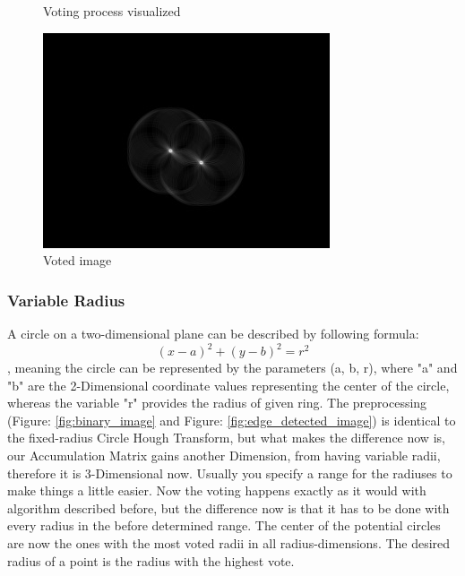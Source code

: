 \begin{figure}[H]
	\caption{Voting process visualized}\label{fig:circlehough_explanation}
	\endminipage
	\hfill
	\includegraphics[width=\linewidth]{images/hough_circle.jpg}
	\caption{Voted image }\label{fig:voted_image}
	\endminipage
\end{figure}

\subsubsection{Variable Radius}
A circle on a two-dimensional plane can be described by following formula: \[ (x - a)^2 + (y - b)^2 = r^2  \]
, meaning the circle can be represented by the parameters (a, b, r), where "a" and "b" are the 2-Dimensional coordinate values representing the center of the circle, whereas the variable "r" provides the radius of given ring. \newline
The preprocessing (Figure: \ref{fig:binary_image} and Figure: \ref{fig:edge_detected_image}) is identical to the fixed-radius Circle Hough Transform, but what makes the difference now is, our Accumulation Matrix gains another Dimension, from having variable radii, therefore it is 3-Dimensional now. Usually you specify a range for the radiuses to make things a little easier. Now the voting happens exactly as it would with algorithm described before, but the difference now is that it has to be done with every radius in the before determined range. The center of the potential circles are now the ones with the most voted radii in all radius-dimensions. The desired radius of a point is the radius with the highest vote.

